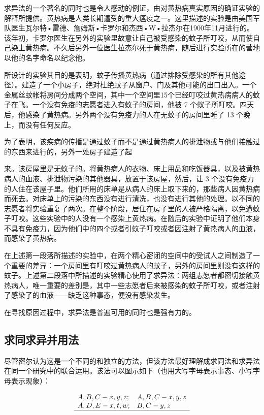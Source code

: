 求异法的一个著名的同时也是令人感动的例证，由对黄热病真实原因的确证实验的解释所提供。黄热病是人类长期遭受的重大瘟疫之一。这里描述的实验是由美国军队医生瓦尔特•雷德、詹姆斯•卡罗尔和杰西•W•拉杰尔在1900年11月进行的。该年初，卡罗尔医生在另外的实验里故意让自己被受感染的蚊子所叮咬，从而使自己染上黄热病。不久后另外一位医生拉杰尔死于黄热病，随后进行实验所在的营地以他的名字命名以纪念他。

所设计的实验其目的是表明，蚊子传播黄热病（通过排除受感染的所有其他途径）。建造了一个小房子，绝对杜绝蚊子从窗户、门及其他可能的出口出入。一个金属丝蚊帐将房间分成两个空间，其中一个空间里15个已经叮咬过黄热病病人的蚊子在飞。一个没有免疫的志愿者进入有蚊子的房间，他被 7 个蚁子所叮咬。四天后，他感染了黄热病。另外两个没有免疫力的人在无蚊子的房间里睡了 13 个晚上，而没有任何反应。

为了表明，该疾病的传播是通过蚊子而不是通过黄热病人的排泄物或与他们接触过的东西来进行的，另外一处房子建造了起

\begin{displayquote}
来。该房屋里是无蚊子的。将黄热病人的衣物、床上用品和吃饭器具，以及被黄热病人的血液、排泄物污染的其他器具，放置于该房屋，然后，让 3 个没有免疫力的人住在该屋子里。他们所用的床单是从病人的床上取下来的，那些病人因黄热病而死去。对床单上的污染的东西没有进行清洗，也没有进行其他的处理。以不同的志愿者将实验重复了两次。在整个阶段，居住在房子里的人被严格隔离，以免遭蚊子叮咬。这些实验中的人没有一个感染上黄热病。在随后的实验中证明了他们本身不具有免疫力，因为他们中的四个或者引蚊子叮咬或者因注射了黄热病人的血液，而感染了黄热病。\cite{garrison1929}
\end{displayquote}

在上述第一段落所描述的实验中，在两个精心密闭的空间中的受试人之间制造了一个重要的差异：一个房间里有叮咬过黄热病人的蚊子，另外的房间里则没有这样的蚊子。上述第二段落中所描述的实验精心使用了求异法：两组志愿者都密切接触黄热病人，唯一重要的差别是，其中一些志愿者后来被感染的蚊子所叮咬，或者注射了感染了的血液——缺乏这种事态，便没有感染发生。

在寻找原因过程中，求异法是普遍可用的同时也是强有力的。

\subsection{求同求异并用法}
尽管密尔认为这是一个不同的和独立的方法，但该方法最好理解成求同法和求异法在同一个研究中的联合运用。该法可以图示如下（也用大写字母表示事态、小写字母表示现象）：

$$
\begin{array}{ll}
A, B, C-x, y, z ; & A, B, C-x, y, z \\
A, D, E-x, t, w ; & B, C-y, z \\
\hline
\end{array}
$$


